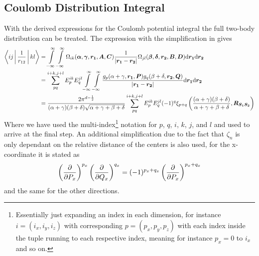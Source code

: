 \subsection{Coulomb Distribution Integral}
    With the derived expressions for the Coulomb potential integral the full
    two-body distribution can be treated. The expression with the
    simplification in  gives
        \begin{align}
            \Braket{ij|\frac{1}{r_{12}}|kl} &= \infint\infint
            \Omega_{ik}(\blds{\alpha},\blds{\gamma},\blds{r_1},
            \blds{A},\blds{C}) \frac{1}{\abs{\blds{r_1} - \blds{r_2}}}
            \Omega_{jl}(\blds{\beta},\blds{\delta},\blds{r_2},
            \blds{B},\blds{D}) \md\blds{r_1} \md\blds{r_2} \nonumber \\
            &= \suml{pq}{i+k,j+l} E^{ik}_pE^{jl}_q \infint\infint
            \frac{g_{p}(\alpha+\gamma,\blds{r_1},\blds{P})
            g_{q}(\beta+\delta,\blds{r_2},\blds{Q})}{\abs{\blds{r_1} -
            \blds{r_2}}} \md\blds{r_1} \md\blds{r_2}\nonumber \\
            &= \frac{2\pi^{d-\frac{1}{2}}}{(\alpha+\gamma)(\beta+\delta)
            \sqrt{\alpha+\gamma+\beta+\delta}} \suml{pq}{i+k,j+l}
            E^{ik}_pE^{jl}_q (-1)^{q} \xi_{p+q}\left(\frac{(\alpha +
            \gamma)(\beta + \delta)}{\alpha + \gamma + \beta +
            \delta},\blds{R_{S_1S_2}}\right)
        \end{align}
    Where we have used the multi-index\footnote{Essentially just expanding an
    index in each dimension, for instance $i=(i_x,i_y,i_z)$ with corresponding
    $p=(p_x, p_y, p_z)$ with each index inside the tuple running to each
    respective index, meaning for instance $p_x=0$ to $i_x$ and so on.}
    notation for $p$, $q$, $i$, $k$, $j$, and $l$ 
    and used  to arrive at the final
    step. An additional simplification due to the fact that $\zeta_n$ is only
    dependant on the relative distance of the centers is also used, for the
    x-coordinate it is stated as
        \begin{equation}
            \prdp{P_x}{p_x}\prdp{Q_x}{q_x} = (-1)^{p_x+q_x} \prdp{P_x}{p_x+q_x}
        \end{equation}
    and the same for the other directions.
